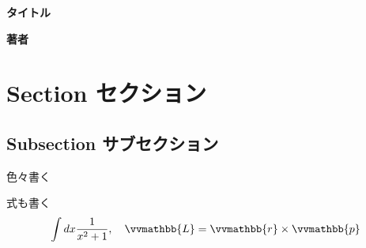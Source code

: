 \documentclass[a4paper,12pt,dvipdfmx]{jlreq}
\newcommand{\symbb}{\vvmathbb}
\begin{document}
\begin{center}
  \textbf{\sffamily \LARGE タイトル}
\end{center}

\begin{flushright}
  \textbf{\sffamily \Large 著者}  
\end{flushright}

\section{Section セクション}
\subsection{Subsection サブセクション}
色々書く

式も書く
\begin{align}
  \int dx \frac{1}{x^2+1},\quad \symbb{L}=\symbb{r}\times \symbb{p}
\end{align}
\end{document}
